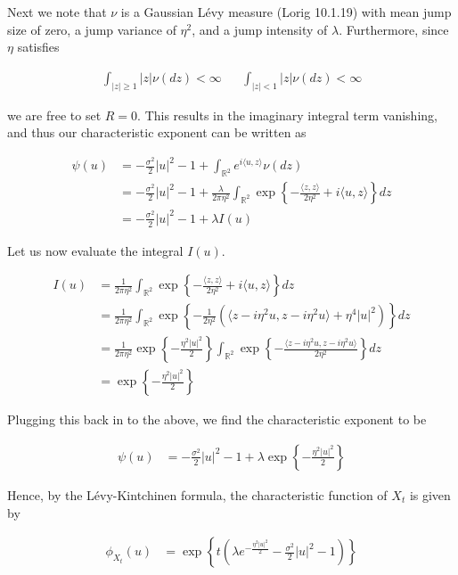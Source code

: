 \documentclass[12pt, a4paper]{article}
\begin{document}
\begin{enumerate}
    Next we note that $\nu$ is a Gaussian Lévy measure (Lorig 10.1.19) with mean jump size of zero, a jump variance of $\eta^2$, and a jump intensity of $\lambda$. Furthermore, since $\eta$ satisfies

    \begin{align*}
        \int_{|z| \ge 1} |z| \nu(dz)< \infty && \int_{|z| <1} |z|\nu(dz) < \infty
    \end{align*}

    we are free to set $R=0$. This results in the imaginary integral term vanishing, and thus our characteristic exponent can be written as 

    \begin{align*}
        \psi(u) &= - \frac{\sigma^2}{2}|u|^2 -1 + \int_{\mathbb R^2} e^{i \langle u, z \rangle} \nu(dz) \\
        &= - \frac{\sigma^2}{2}|u|^2 -1 + \frac{\lambda}{2\pi \eta^2} \int_{\mathbb R^2} \exp \left\{ - \frac{\langle z, z \rangle}{2\eta^2}+i\langle u, z \rangle \right\} dz \\
        &= -\frac{\sigma^2}{2}|u|^2 -1 + \lambda I(u)
    \end{align*}

    Let us now evaluate the integral $I(u)$. 

    \begin{align*}
        I(u) &= \frac{1}{2\pi \eta^2}\int_{\mathbb R^2} \exp \left\{ - \frac{\langle z, z \rangle}{2\eta^2}+i\langle u, z \rangle \right\} dz \\
        &= \frac{1}{2\pi \eta^2} \int_{\mathbb R^2} \exp \left\{ - \frac{1}{2\eta^2} \left( \langle z-i\eta^2 u, z-i\eta^2 u \rangle + \eta^4 |u|^2 \right) \right\} dz \\
        &= \frac{1}{2\pi \eta^2}\exp\left\{-\frac{\eta^2 |u|^2}{2}\right\} \int_{\mathbb R^2} \exp \left\{ - \frac{\langle z-i\eta^2 u, z-i \eta^2 u \rangle}{2\eta^2} \right\} dz \\
        &= \exp\left\{-\frac{\eta^2 |u|^2}{2}\right\}
    \end{align*}

    Plugging this back in to the above, we find the characteristic exponent to be 

    \begin{align*}
        \psi(u) &= -\frac{\sigma^2}{2}|u|^2 -1 + \lambda \exp \left\{ - \frac{\eta^2 |u|^2}{2} \right\}
    \end{align*}

    Hence, by the Lévy-Kintchinen formula, the characteristic function of $X_t$ is given by 

    \begin{align*}
        \phi_{X_t}(u) &= \exp \left\{t \left(\lambda e^{ - \frac{\eta^2 |u|^2}{2}} - \frac{\sigma^2}{2}|u|^2 -1 \right) \right\}
    \end{align*}
    
\end{enumerate}
\end{document}
